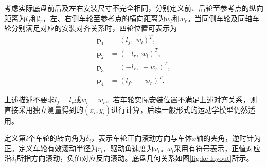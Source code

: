 \documentclass[UTF8,12pt,a4paper,openany]{ctexbook}
\begin{document}
考虑实际底盘前后及左右安装尺寸不完全相同，分别定义前、后轮至参考点的纵向距离为$l_f$和$l_r$，左、右侧车轮至参考点的横向距离为$w_l$和$w_r$。当同侧车轮及同轴车轮分别满足对应的安装对齐关系时，四轮位置可表示为
\begin{equation}
\begin{aligned}
    \boldsymbol{p}_1 &= (l_f,\;w_l)^{T},\\
    \boldsymbol{p}_2 &= (-l_r,\;w_l)^{T},\\
    \boldsymbol{p}_3 &= (-l_r,\;-w_r)^{T},\\
    \boldsymbol{p}_4 &= (l_f,\;-w_r)^{T}.
\end{aligned}
\label{eq:kc-wheel-coordinates}
\end{equation}

上述描述不要求$l_f=l_r$或$w_l=w_r$。若车轮实际安装位置不满足上述对齐关系，则直接采用独立测量得到的$(x_i,y_i)$进行计算，后续一般形式的运动学模型仍然适用。

定义第$i$个车轮的转向角为$\delta_i$，表示车轮正向滚动方向与车体$x$轴的夹角，逆时针为正。定义车轮有效滚动半径为$r_i$，驱动角速度为$\omega_i$。$\omega_i$采用有符号表示，正值对应沿$\delta_i$所指方向滚动，负值对应反向滚动。底盘几何关系如图\ref{fig:kc-layout}所示。
\end{document}
